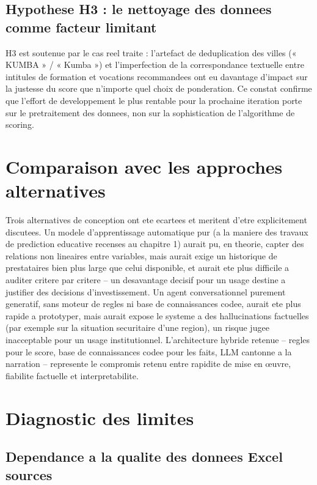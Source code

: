 \documentclass[12pt,a4paper,twoside,openany]{report}
\begin{document}
\subsection{Hypothese H3 : le nettoyage des donnees comme facteur limitant}

H3 est soutenue par le cas reel traite : l'artefact de deduplication des villes (« KUMBA » / « Kumba ») et l'imperfection de la correspondance textuelle entre intitules de formation et vocations recommandees ont eu davantage d'impact sur la justesse du score que n'importe quel choix de ponderation. Ce constat confirme que l'effort de developpement le plus rentable pour la prochaine iteration porte sur le pretraitement des donnees, non sur la sophistication de l'algorithme de scoring.

\section{Comparaison avec les approches alternatives}

Trois alternatives de conception ont ete ecartees et meritent d'etre explicitement discutees. Un modele d'apprentissage automatique pur (a la maniere des travaux de prediction educative recenses au chapitre 1) aurait pu, en theorie, capter des relations non lineaires entre variables, mais aurait exige un historique de prestataires bien plus large que celui disponible, et aurait ete plus difficile a auditer critere par critere -- un desavantage decisif pour un usage destine a justifier des decisions d'investissement. Un agent conversationnel purement generatif, sans moteur de regles ni base de connaissances codee, aurait ete plus rapide a prototyper, mais aurait expose le systeme a des hallucinations factuelles (par exemple sur la situation securitaire d'une region), un risque jugee inacceptable pour un usage institutionnel. L'architecture hybride retenue -- regles pour le score, base de connaissances codee pour les faits, LLM cantonne a la narration -- represente le compromis retenu entre rapidite de mise en \oe uvre, fiabilite factuelle et interpretabilite.

\section{Diagnostic des limites}

\subsection{Dependance a la qualite des donnees Excel sources}
\end{document}
